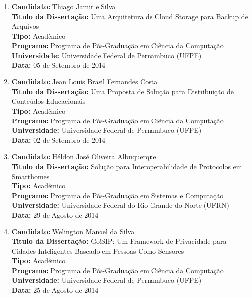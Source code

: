 \documentclass[a4paper,oneside,10pt]{article}
\begin{document}
\begin{enumerate}
\item       \textbf{Candidato:} Thiago Jamir e Silva \mbox{} \\
            \textbf{T\'{\i}tulo da Disserta\c{c}\~{a}o:} Uma Arquitetura de Cloud Storage para Backup de Arquivos\\
            \textbf{Tipo:} Acadêmico\\
            \textbf{Programa:} Programa de Pós-Graduação em Ciência da Computação\\
            \textbf{Universidade:} Universidade Federal de Pernambuco (UFPE)\\
            \textbf{Data:} 05 de Setembro de 2014

\item       \textbf{Candidato:} Jean Louis Brasil Fernandes Costa \mbox{} \\
            \textbf{T\'{\i}tulo da Disserta\c{c}\~{a}o:} Uma Proposta de Solução para Distribuição de Conteúdos Educacionais\\
            \textbf{Tipo:} Acadêmico\\
            \textbf{Programa:} Programa de Pós-Graduação em Ciência da Computação\\
            \textbf{Universidade:} Universidade Federal de Pernambuco (UFPE)\\
            \textbf{Data:} 02 de Setembro de 2014

\item       \textbf{Candidato:} Héldon José Oliveira Albuquerque \mbox{} \\
            \textbf{T\'{\i}tulo da Disserta\c{c}\~{a}o:} Solução para Interoperabilidade de Protocolos em Smarthomes\\
            \textbf{Tipo:} Acadêmico\\
            \textbf{Programa:} Programa de Pós-Graduação em Sistemas e Computação\\
            \textbf{Universidade:} Universidade Federal do Rio Grande do Norte (UFRN)\\
            \textbf{Data:} 29 de Agosto de 2014

\item       \textbf{Candidato:} Welington Manoel da Silva \mbox{} \\
            \textbf{T\'{\i}tulo da Disserta\c{c}\~{a}o:} Go!SIP: Um Framework de Privacidade para Cidades Inteligentes Baseado em Pessoas Como Sensores\\
            \textbf{Tipo:} Acadêmico \\
            \textbf{Programa:} Programa de Pós-Graduação em Ciência da Computação\\
            \textbf{Universidade:} Universidade Federal de Pernambuco (UFPE)\\
            \textbf{Data:} 25 de Agosto de 2014
\end{enumerate}
\end{document}
